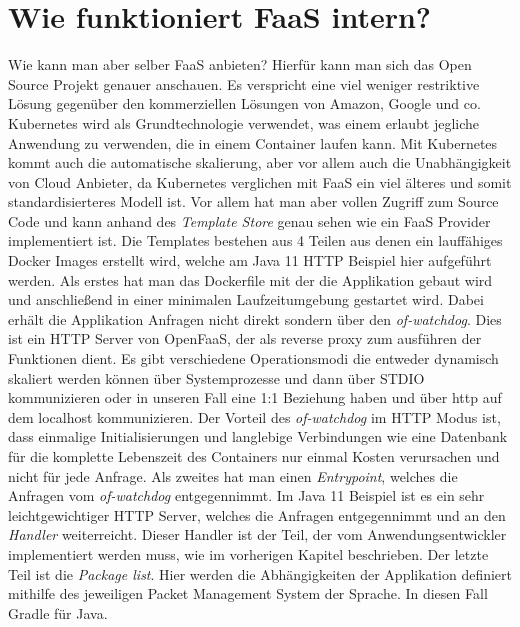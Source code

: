\documentclass[12pt, a4paper]{article}
\begin{document}
\section{Wie funktioniert FaaS intern?}
Wie kann man aber selber \ac{FaaS} anbieten?
\newline
Hierfür kann man sich das Open Source Projekt \cite[OpenFaaS]{openfaas_github} genauer anschauen.
Es verspricht eine viel weniger restriktive Lösung gegenüber den kommerziellen Lösungen von Amazon, Google und co.
Kubernetes wird als Grundtechnologie verwendet, was einem erlaubt jegliche Anwendung zu verwenden, die in einem Container laufen kann.
Mit Kubernetes kommt auch die automatische skalierung, aber vor allem auch die Unabhängigkeit von Cloud Anbieter, da Kubernetes verglichen mit \ac{FaaS} ein viel älteres und somit standardisierteres Modell ist.
\newline
Vor allem hat man aber vollen Zugriff zum Source Code und kann anhand des \emph{Template Store}\cite{openfaas_templateStore} genau sehen wie ein \ac{FaaS} Provider implementiert ist.
Die Templates bestehen aus 4 Teilen aus denen ein lauffähiges Docker Images erstellt wird, welche am Java 11 HTTP Beispiel \cite{openfaas_templateStore_java11} hier aufgeführt werden.
\newline
\newline
Als erstes hat man das Dockerfile mit der die Applikation gebaut wird und anschließend in einer minimalen Laufzeitumgebung gestartet wird.
\newline
Dabei erhält die Applikation Anfragen nicht direkt sondern über den \emph{of-watchdog}\cite{openfaas_ofWatchdog}.
Dies ist ein HTTP Server von OpenFaaS, der als reverse proxy zum ausführen der Funktionen dient.
Es gibt verschiedene Operationsmodi die entweder dynamisch skaliert werden können über Systemprozesse und dann über STDIO kommunizieren oder in unseren Fall eine 1:1 Beziehung haben und über http auf dem localhost kommunizieren.
Der Vorteil des \emph{of-watchdog} im HTTP Modus ist, dass einmalige Initialisierungen und langlebige Verbindungen wie eine Datenbank für die komplette Lebenszeit des Containers nur einmal Kosten verursachen und nicht für jede Anfrage.
\newline
\newline
Als zweites hat man einen \emph{Entrypoint}, welches die Anfragen vom \emph{of-watchdog} entgegennimmt. Im Java 11 Beispiel ist es ein sehr leichtgewichtiger HTTP Server, welches die Anfragen entgegennimmt und an den \emph{Handler} weiterreicht.
Dieser Handler ist der Teil, der vom Anwendungsentwickler implementiert werden muss, wie im vorherigen Kapitel beschrieben.
\newline
\newline
Der letzte Teil ist die \emph{Package list}.
Hier werden die Abhängigkeiten der Applikation definiert mithilfe des jeweiligen Packet Management System der Sprache.
In diesen Fall Gradle für Java.
\end{document}
